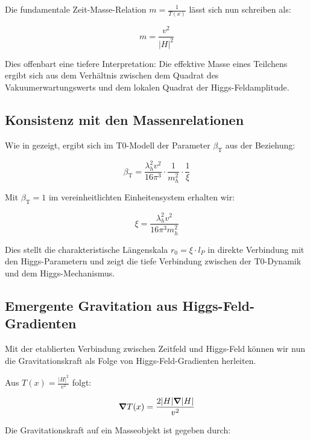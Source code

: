 \documentclass[12pt,a4paper]{article}
\newcommand{\Tfield}{T(x)}
\newcommand{\betaT}{\beta_{\text{T}}}
\begin{document}
	Die fundamentale Zeit-Masse-Relation \(m = \frac{1}{\Tfield}\) lässt sich nun schreiben als:
	
	\begin{equation}
		m = \frac{v^2}{|H|^2}
	\end{equation}
	
	Dies offenbart eine tiefere Interpretation: Die effektive Masse eines Teilchens ergibt sich aus dem Verhältnis zwischen dem Quadrat des Vakuumerwartungswerts und dem lokalen Quadrat der Higgs-Feldamplitude.
	
	\subsection{Konsistenz mit den Massenrelationen}
	
	Wie in \cite{pascher_params_2025} gezeigt, ergibt sich im T0-Modell der Parameter \(\betaT\) aus der Beziehung:
	
	\begin{equation}
		\betaT = \frac{\lambda_h^2 v^2}{16\pi^3} \cdot \frac{1}{m_h^2} \cdot \frac{1}{\xi}
	\end{equation}
	
	Mit \(\betaT = 1\) im vereinheitlichten Einheitensystem erhalten wir:
	
	\begin{equation}
		\xi = \frac{\lambda_h^2 v^2}{16\pi^3 m_h^2}
	\end{equation}
	
	Dies stellt die charakteristische Längenskala \(r_0 = \xi \cdot l_P\) in direkte Verbindung mit den Higgs-Parametern und zeigt die tiefe Verbindung zwischen der T0-Dynamik und dem Higgs-Mechanismus.
	
	\subsection{Emergente Gravitation aus Higgs-Feld-Gradienten}
	
	Mit der etablierten Verbindung zwischen Zeitfeld und Higgs-Feld können wir nun die Gravitationskraft als Folge von Higgs-Feld-Gradienten herleiten.
	
	Aus \(\Tfield = \frac{|H|^2}{v^2}\) folgt:
	
	\begin{equation}
		\grad \Tfield = \frac{2|H|\grad|H|}{v^2}
	\end{equation}
	
	Die Gravitationskraft auf ein Masseobjekt ist gegeben durch:
	
\end{document}
